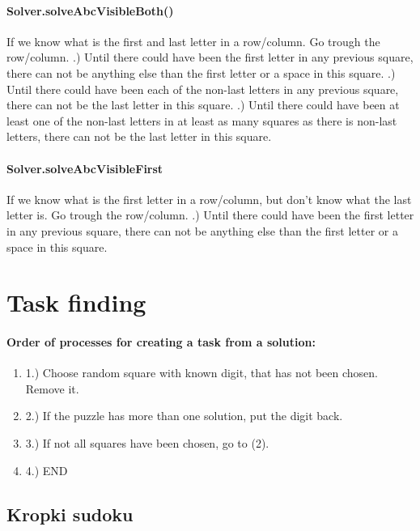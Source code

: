 \documentclass{report}
\begin{document}
\paragraph{Solver.solveAbcVisibleBoth()}
If we know what is the first and last letter in a row/column. Go trough the row/column. .) Until there could have been the first letter in any previous square, there can not be anything else than the first letter or a space in this square. .) Until there could have been each of the non-last letters in any previous square, there can not be the last letter in this square. .) Until there could have been at least one of the non-last letters in at least as many squares as there is non-last letters, there can not be the last letter in this square.

\paragraph{Solver.solveAbcVisibleFirst}
If we know what is the first letter in a row/column, but don't know what the last letter is. Go trough the row/column. .) Until there could have been the first letter in any previous square, there can not be anything else than the first letter or a space in this square.

\section{Task finding}

\paragraph{Order of processes for creating a task from a solution:}
\begin{enumerate}
    \item[] 1.) Choose random square with known digit, that has not been chosen. Remove it.
    \item[] 2.) If the puzzle has more than one solution, put the digit back.
    \item[] 3.) If not all squares have been chosen, go to (2).
    \item[] 4.) END
\end{enumerate}

\subsection{Kropki sudoku}
\end{document}
